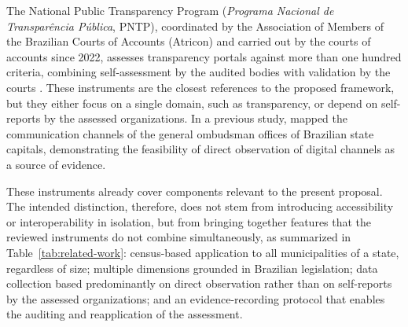 \documentclass[12pt]{article}
\begin{document}
The National Public Transparency Program (\textit{Programa Nacional de Transparência Pública}, PNTP), coordinated by the Association of Members of the Brazilian Courts of Accounts (Atricon) and carried out by the courts of accounts since 2022, assesses transparency portals against more than one hundred criteria, combining self-assessment by the audited bodies with validation by the courts \cite{atricon2026pntp}. These instruments are the closest references to the proposed framework, but they either focus on a single domain, such as transparency, or depend on self-reports by the assessed organizations. In a previous study, \cite{zahn2024mapping} mapped the communication channels of the general ombudsman offices of Brazilian state capitals, demonstrating the feasibility of direct observation of digital channels as a source of evidence.

These instruments already cover components relevant to the present proposal. The intended distinction, therefore, does not stem from introducing accessibility or interoperability in isolation, but from bringing together features that the reviewed instruments do not combine simultaneously, as summarized in Table~\ref{tab:related-work}: census-based application to all municipalities of a state, regardless of size; multiple dimensions grounded in Brazilian legislation; data collection based predominantly on direct observation rather than on self-reports by the assessed organizations; and an evidence-recording protocol that enables the auditing and reapplication of the assessment.
\end{document}
